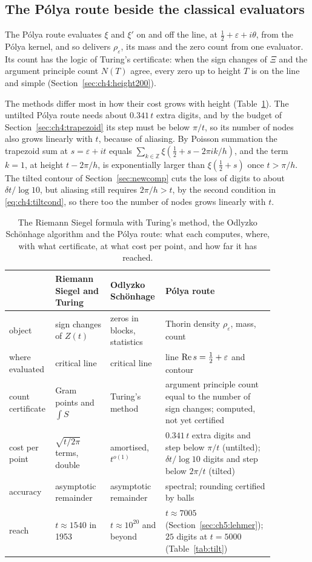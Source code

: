 \subsection{The P\'olya route beside the classical evaluators}

The P\'olya route evaluates $\xi$ and $\xi'$ on and off the line, at $\tfrac12+\varepsilon+i\theta$, from the P\'olya kernel, and so delivers $\rho_\varepsilon$, its mass and the zero count from one evaluator. Its count has the logic of Turing's certificate: when the sign changes of $\Xi$ and the argument principle count $N(T)$ agree, every zero up to height $T$ is on the line and simple (Section~\ref{sec:ch4:height200}).

The methods differ most in how their cost grows with height (Table~\ref{tab:compare}). The untilted P\'olya route needs about $0.341\,t$ extra digits, and by the budget of Section~\ref{sec:ch4:trapezoid} its step must be below $\pi/t$, so its number of nodes also grows linearly with $t$, because of aliasing. By Poisson summation the trapezoid sum at $s=\varepsilon+it$ equals $\sum_{k\in\mathbb Z}\xi(\frac12+s-2\pi ik/h)$, and the term $k=1$, at height $t-2\pi/h$, is exponentially larger than $\xi(\frac12+s)$ once $t>\pi/h$. The tilted contour of Section~\ref{sec:newcomp} cuts the loss of digits to about $\delta t/\log10$, but aliasing still requires $2\pi/h>t$, by the second condition in \eqref{eq:ch4:tiltcond}, so there too the number of nodes grows linearly with $t$.

\begin{table}[t]
\centering\footnotesize
\begin{tabular}{p{0.144\linewidth}p{0.2\linewidth}p{0.2\linewidth}p{0.325\linewidth}}
\toprule
 & \raggedright Riemann Siegel and Turing & Odlyzko Sch\"onhage & P\'olya route\tabularnewline
\midrule
object & sign changes of $Z(t)$ & zeros in blocks, statistics & Thorin density $\rho_\varepsilon$, mass, count\\
where evaluated & critical line & critical line & line $\operatorname{Re} s=\tfrac12+\varepsilon$ and contour\\
count certificate & Gram points and $\int S$ & Turing's method & argument principle count equal to the number of sign changes; computed, not yet certified\\
cost per point & $\sqrt{t/2\pi}$ terms, double & amortised, $t^{o(1)}$ & $0.341\,t$ extra digits and step below $\pi/t$ (untilted); $\delta t/\log10$ digits and step below $2\pi/t$ (tilted)\\
accuracy & asymptotic remainder & asymptotic remainder & spectral; rounding certified by balls\\
reach & $t\approx1540$ in 1953 & $t\approx10^{20}$ and beyond \cite{Odlyzko92,Odlyzko01} & $t\approx7005$ (Section~\ref{sec:ch5:lehmer}); $25$ digits at $t=5000$ (Table~\ref{tab:tilt})\\
\bottomrule
\end{tabular}
\caption{The Riemann Siegel formula with Turing's method, the Odlyzko Sch\"onhage algorithm and the P\'olya route: what each computes, where, with what certificate, at what cost per point, and how far it has reached.}
\label{tab:compare}
\end{table}

